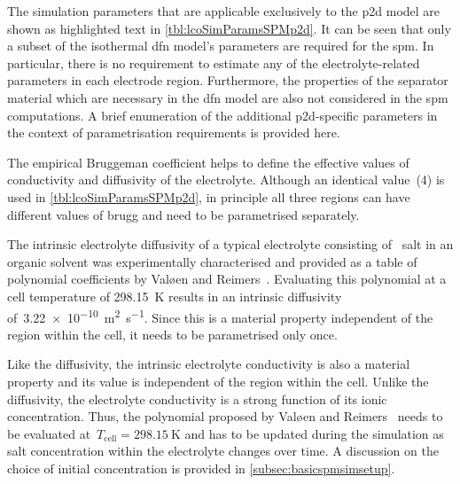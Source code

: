 The simulation parameters that are applicable exclusively to the \gls{p2d} model
are shown as  highlighted text in \cref{tbl:lcoSimParamsSPMp2d}. It  can be seen
that only a  subset of the isothermal \gls{dfn} model's  parameters are required
for the \gls{spm}. In particular, there is no requirement to estimate any of the
electrolyte-related  parameters  in  each  electrode  region.  Furthermore,  the
properties of the separator material which  are necessary in the \gls{dfn} model
are also  not considered in the  \gls{spm} computations. A brief  enumeration of
the additional  \gls{p2d}-specific parameters in the  context of parametrisation
requirements is provided here.

\begin{enumdescriptnum}[leftmargin=!,itemsep=1ex,labelwidth=\widthof{$\symbf{\text{brugg}_j}\ \scriptstyle (\times 3)$abc}
    ,partopsep=0pt
    ,topsep=0pt
    ]

      The  empirical Bruggeman  coefficient  helps
    to   define   the  effective   values   of   conductivity  and   diffusivity
    of   the  electrolyte.   Although  an   identical  value~(4)   is  used   in
    \cref{tbl:lcoSimParamsSPMp2d},  in  principle  all three  regions  can  have
    different values of brugg and need to be parametrised separately.

      The  intrinsic  electrolyte   diffusivity  of  a  typical
    electrolyte  consisting  of  ~salt in  an  organic  solvent  was
    experimentally  characterised   and  provided  as  a   table  of  polynomial
    coefficients  by  Valøen  and  Reimers~\cite{Valoen2005}.  Evaluating  this
    polynomial  at a  cell  temperature of  \SI{298.15}{\kelvin}  results in  an
    intrinsic  diffusivity  of~\SI{3.22e-10}{\meter\squared\per\second}.  Since
    this is  a material property independent  of the region within  the cell, it
    needs to be parametrised only once.

       Like    the   diffusivity,   the
    intrinsic electrolyte conductivity is also a material property and its value
    is independent  of the region within  the cell. Unlike the  diffusivity, the
    electrolyte conductivity  is a strong  function of its  ionic concentration.
    Thus, the polynomial proposed by Valøen and Reimers~\cite{Valoen2005} needs
    to  be evaluated  at~$T_\text{cell}= \SI{298.15}{\kelvin}$  and  has to  be
    updated during the  simulation as salt concentration  within the electrolyte
    changes over time. A discussion on the choice of initial concentration is
    provided in \cref{subsec:basicspmsimsetup}.


\end{enumdescriptnum}
